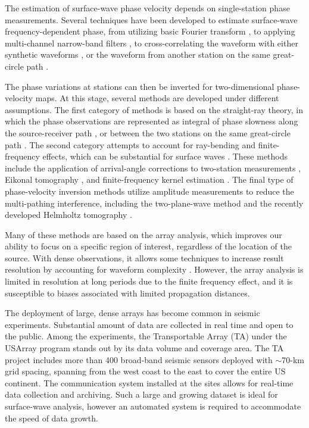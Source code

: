 \documentclass[12pt,oneside]{book}
\begin{document}
The estimation of surface-wave phase velocity depends on single-station phase measurements. Several techniques have been developed to estimate surface-wave frequency-dependent phase, from utilizing basic Fourier transform \citep{Forsyth:2005id}, to applying multi-channel narrow-band filters \citep[e.g.][]{Levshin:1992ve}, to cross-correlating the waveform with either synthetic waveforms \citep[e.g.][]{Gee:1992ww, Ekstrom:1997ff}, or the waveform from another station on the same great-circle path \citep[e.g.][]{Landisman:1969gt}.

The phase variations at stations can then be inverted for two-dimensional phase-velocity maps. At this stage, several methods are developed under different assumptions. The first category of methods is based on the straight-ray theory, in which the phase observations are represented as integral of phase slowness along the source-receiver path \citep[e.g.][]{Nettles:2008ha}, or between the two stations on the same great-circle path \citep[e.g.][]{Yao:2005ha,foster:2014kna}. The second category attempts to account for ray-bending and finite-frequency effects, which can be substantial for surface waves \citep[e.g.][]{Evernden:1954ui,Zhou:2005fk}. These methods include the application of arrival-angle corrections to two-station measurements \citep{foster:2014kna}, Eikonal tomography \citep{Lin:2009fx}, and finite-frequency kernel estimation \citep{Zhou:2006gna}. The final type of phase-velocity inversion methods utilize amplitude measurements to reduce the multi-pathing interference, including the two-plane-wave method \citep{Forsyth:2005id} and the recently developed Helmholtz tomography \citep{Lin:2011fw}.

Many of these methods are based on the array analysis, which improves our ability to focus on a specific region of interest, regardless of the location of the source. With dense observations, it allows some techniques to increase result resolution by accounting for waveform complexity \citep[e.g.][]{Forsyth:2005id,Lin:2011fw}. However, the array analysis is limited in resolution at long periods due to the finite frequency effect, and it is susceptible to biases associated with limited propagation distances.

The deployment of large, dense arrays has become common in seismic experiments. Substantial amount of data are collected in real time and open to the public. 
Among the experiments, the Transportable Array (TA) under the USArray program stands out by its data volume and coverage area. The TA project includes more than 400 broad-band seismic sensors deployed with $\sim$70-km grid spacing, spanning from the west coast to the east to cover the entire US continent. The communication system installed at the sites allows for real-time data collection and archiving. Such a large and growing dataset is ideal for surface-wave analysis, however an automated system is required to accommodate the speed of data growth.
\end{document}
